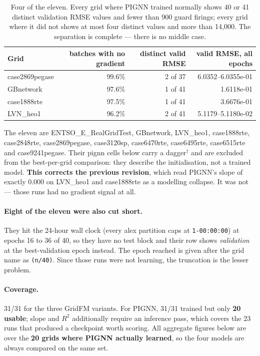 \documentclass[10pt]{article}
\begin{document}
\begin{table}[H]
\centering\small
\begin{tabular}{lrrr}
\toprule
Grid & batches with no gradient & distinct valid RMSE & valid RMSE, all epochs \\
\midrule
case2869pegase & 99.6\% & 2 of 37 & 6.0352--6.0355e-01 \\
GBnetwork      & 97.6\% & 1 of 41 & 1.6118e-01 \\
case1888rte    & 97.5\% & 1 of 41 & 3.6676e-01 \\
LVN\_heo1      & 96.2\% & 2 of 41 & 5.1179--5.1180e-02 \\
\bottomrule
\end{tabular}
\caption{Four of the eleven. Every grid where PIGNN trained normally shows 40 or
41 distinct validation RMSE values and fewer than 900 guard firings; every grid
where it did not shows at most four distinct values and more than 14{,}000. The
separation is complete --- there is no middle case.}
\end{table}

The eleven are ENTSO\_E\_RealGridTest, GBnetwork, LVN\_heo1, case1888rte,
case2848rte, case2869pegase, case3120sp, case6470rte, case6495rte, case6515rte
and case9241pegase. Their pignn cells below carry a dagger$^\dagger$ and are
excluded from the best-per-grid comparison: they describe the initialisation,
not a trained model. \textbf{This corrects the previous revision}, which read
PIGNN's slope of exactly 0.000 on LVN\_heo1 and case1888rte as a modelling
collapse. It was not --- those runs had no gradient signal at all.

\paragraph{Eight of the eleven were also cut short.} They hit the 24-hour wall
clock (every alex partition caps at \texttt{1-00:00:00}) at epochs 16 to 36 of
40, so they have no test block and their row shows \emph{validation} at the
best-validation epoch instead. The epoch reached is given after the grid name as
\texttt{(n/40)}. Since those runs were not learning, the truncation is the
lesser problem.

\paragraph{Coverage.} 31/31 for the three GridFM variants. For PIGNN, 31/31
trained but only \textbf{20 usable}; slope and $R^2$ additionally require an
inference pass, which covers the 23 runs that produced a checkpoint worth
scoring. All aggregate figures below are over the \textbf{20 grids where PIGNN
actually learned}, so the four models are always compared on the same set.
\end{document}
